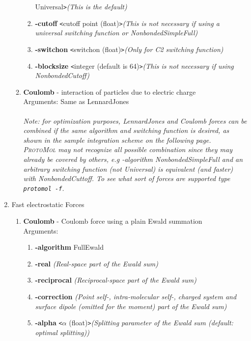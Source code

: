 \documentclass[11pt]{report}
\newcommand{\ProtoMol}{\textsc{ProtoMol }}
\newcommand{\tempstart}{\texttt{<}}
\newcommand{\tempend}{\texttt{>}}
\providecommand{\ttsmall}[1]{\texttt{\small\mbox{#1}}}
\begin{document}
\begin{enumerate}
\begin{enumerate}
\begin{enumerate}
      Universal\tempend  {\it (This is the default)}
    \item {\bf -cutoff} \tempstart cutoff point (float)\tempend  {\it (This is not
        necessary if using a universal switching function or
        NonbondedSimpleFull)}
    \item {\bf -switchon} \tempstart switchon (float)\tempend  {\it (Only for C2 switching function)}
    \item {\bf -blocksize} \tempstart integer (default is 64)\tempend  {\it (This is not
        necessary if using NonbondedCutoff)}      
    \end{enumerate}
  \item {\bf Coulomb} - interaction of particles due to electric charge\\
    Arguments: Same as LennardJones \\ \\
    {\it Note: for optimization purposes, LennardJones and Coulomb forces
      can be combined if the same algorithm and switching function is
      desired, as shown in the sample integration scheme on the following
      page.\\
      \ProtoMol may not recognize all possible combination since they  may
      already be covered by others, e.g {-algorithm} NonbondedSimpleFull and
      an arbitrary switching function (not Universal) is equivalent (and
      faster) with  NonbondedCuttoff. To see what sort of forces are
      supported type \ttsmall{protomol -f}.}    
  \end{enumerate}
\newpage
\item Fast electrostatic Forces
  \begin{enumerate}
  \item {\bf Coulomb} -   Coulomb force using a plain Ewald summation\\
    Arguments:
    \begin{enumerate}
    \item {\bf -algorithm} FullEwald
    \item {\bf -real} {\it (Real-space part of the Ewald sum)}
    \item {\bf -reciprocal} {\it (Reciprocal-space part of the Ewald sum)}
    \item {\bf -correction} {\it (Point self-, intra-molecular self-, charged system and surface dipole (omitted for the moment) part of the Ewald sum)}
    \item {\bf -alpha} \tempstart $\alpha$   (float)\tempend  {\it (Splitting parameter of the Ewald sum (default:    optimal splitting))}

\end{enumerate}
\end{enumerate}
\end{enumerate}
\end{document}
